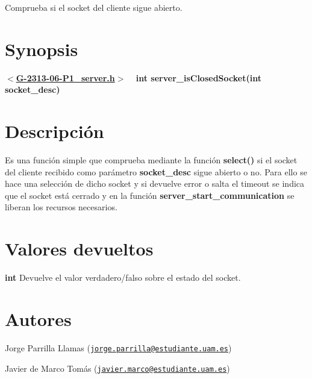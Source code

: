 Comprueba si el socket del cliente sigue abierto.\hypertarget{server_isClosedSocket_Synopsis}{}\section{Synopsis}\label{server_isClosedSocket_Synopsis}
{ {\bfseries $<$\hyperlink{G-2313-06-P1__server_8h_source}{G-\/2313-\/06-\/\+P1\+\_\+server.\+h}$>$} ~\newline
 {\bfseries int server\+\_\+is\+Closed\+Socket(int socket\+\_\+desc)} } \hypertarget{server_isClosedSocket_descripcion}{}\section{Descripción}\label{server_isClosedSocket_descripcion}
Es una función simple que comprueba mediante la función {\bfseries select()} si el socket del cliente recibido como parámetro {\bfseries socket\+\_\+desc} sigue abierto o no. Para ello se hace una selección de dicho socket y si devuelve error o salta el timeout se indica que el socket está cerrado y en la función {\bfseries server\+\_\+start\+\_\+communication} se liberan los recursos necesarios.\hypertarget{server_isClosedSocket_return}{}\section{Valores devueltos}\label{server_isClosedSocket_return}

\begin{DoxyItemize}
\item {\bfseries int} Devuelve el valor verdadero/falso sobre el estado del socket. 
\end{DoxyItemize}\hypertarget{server_isClosedSocket_authors}{}\section{Autores}\label{server_isClosedSocket_authors}

\begin{DoxyItemize}
\item Jorge Parrilla Llamas (\href{mailto:jorge.parrilla@estudiante.uam.es}{\tt jorge.\+parrilla@estudiante.\+uam.\+es}) 
\item Javier de Marco Tomás (\href{mailto:javier.marco@estudiante.uam.es}{\tt javier.\+marco@estudiante.\+uam.\+es}) 
\end{DoxyItemize}